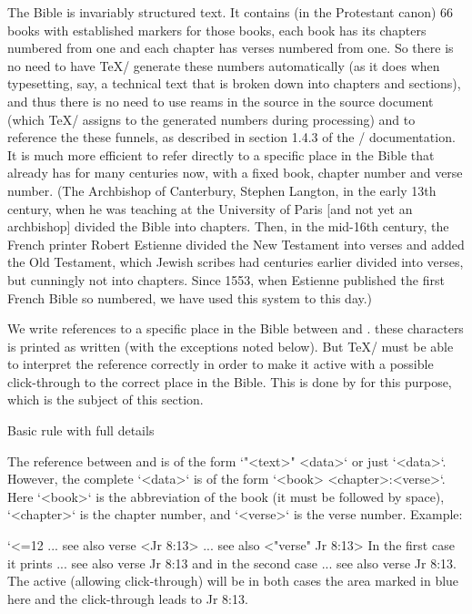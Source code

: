 {{The Bible is invariably
structured text. It contains (in the Protestant canon) 66 books with established markers for those books,
each book has its chapters numbered from one and each chapter has verses
numbered from one. So there is no need to have \TeX/ generate these numbers
automatically (as it does when typesetting, say, a technical text that is broken down into
chapters and sections), and thus there is no need to use reams in the source
in the source document (which \TeX/ assigns to the generated numbers during processing) and to reference the
these funnels, as described in section 1.4.3 of the \OpTeX/ documentation. It is
much more efficient to refer directly to a specific place in the Bible that already has
for many centuries now, with a fixed book, chapter number and verse number.
(The Archbishop of Canterbury, Stephen Langton, in the early 13th century, when he was teaching at the University of Paris [and not yet an archbishop]
divided the Bible into chapters. 
Then, in the mid-16th century, the French printer Robert Estienne divided the New Testament into verses and added the Old Testament,
which Jewish scribes had centuries earlier divided into verses, but cunningly not into chapters.
Since 1553, when Estienne published the first French Bible so numbered, we have used this system to this day.)


We write references to a specific place in the Bible between \code{<} and \code{>}.
these characters is printed as written (with the exceptions noted below). 
But \TeX/ must be able to interpret the reference correctly in order to
make it active with a possible click-through to the correct place in the Bible. This is done by
for this purpose, which is the subject of this section.

Basic rule with full details

The reference between \code{<} and \code{>} is of the form `"<text>" <data>` or just
`<data>`. However, the complete `<data>` is of the form
`<book> <chapter>:<verse>`. Here `<book>` is the abbreviation of the book (it must be followed by
space), `<chapter>` is the chapter number, and `<verse>` is the verse number.
Example:

\begtt \catcode`<=12
... see also verse <Jr 8:13>
... see also <"verse" Jr 8:13>
\endtt
In the first case it prints ... see also verse {\Blue Jr 8:13} and in the second case
... see also {\Blue verse Jr 8:13}. The active (allowing click-through) will be in both cases
the area marked in blue here and the click-through leads to Jr 8:13.

}}
